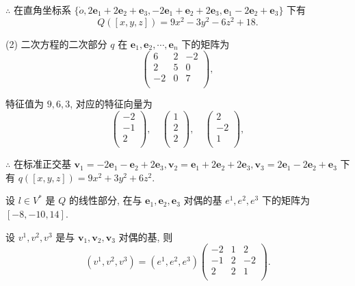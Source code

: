 \documentclass[color=black,device=normal,lang=cn,mode=geye]{elegantnote}
\begin{document}
\begin{solution}
    $\therefore$ 在直角坐标系 $\{\dot{o},2\boldsymbol{e}_1+2\boldsymbol{e}_2+\boldsymbol{e}_3,-2\boldsymbol{e}_1+\boldsymbol{e}_2+2\boldsymbol{e}_3,\boldsymbol{e}_1-2\boldsymbol{e}_2+\boldsymbol{e}_3\}$ 下有
    \[Q([x,y,z])=9x^2-3y^2-6z^2+18.\]

    (2) 二次方程的二次部分 $q$ 在 $\boldsymbol{e}_1,\boldsymbol{e}_2,\cdots,\boldsymbol{e}_n$ 下的矩阵为
    \[\begin{pmatrix}
        6 & 2 & -2 \\
        2 & 5 & 0 \\
        -2 & 0 & 7 \\
    \end{pmatrix},\]

    特征值为 $9,6,3$, 对应的特征向量为
    \[\begin{pmatrix}
        -2 \\
        -1 \\
        2 \\
    \end{pmatrix},\quad\begin{pmatrix}
        1 \\
        2 \\
        2 \\
    \end{pmatrix},\quad\begin{pmatrix}
        2 \\
        -2 \\
        1 \\
    \end{pmatrix},\]

    $\therefore$ 在标准正交基 $\boldsymbol{v}_1=-2\boldsymbol{e}_1-\boldsymbol{e}_2+2\boldsymbol{e}_3,\boldsymbol{v}_2=\boldsymbol{e}_1+2\boldsymbol{e}_2+2\boldsymbol{e}_3,\boldsymbol{v}_3=2\boldsymbol{e}_1-2\boldsymbol{e}_2+\boldsymbol{e}_3$ 下有 $q([x,y,z])=9x^2+3y^2+6z^2$.

    设 $l\in V^*$ 是 $Q$ 的线性部分, 在与 $\boldsymbol{e}_1,\boldsymbol{e}_2,\boldsymbol{e}_3$ 对偶的基 $e^1,e^2,e^3$ 下的矩阵为 $[-8,-10,14]$.

    设 $v^1,v^2,v^3$ 是与 $\boldsymbol{v}_1,\boldsymbol{v}_2,\boldsymbol{v}_3$ 对偶的基, 则
    \[(v^1,v^2,v^3)=(e^1,e^2,e^3)\begin{pmatrix}
        -2 & 1 & 2  \\
        -1 & 2 & -2 \\
        2  & 2 & 1  \\
    \end{pmatrix}.\]


\end{solution}
\end{document}
